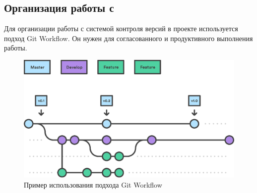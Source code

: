 \subsection{Организация работы с \textcite{git}}
Для организации работы с системой контроля версий в проекте используется подход Git Workflow. Он нужен для согласованного и продуктивного выполнения работы.

\begin{figure}[h!]
    \begin{center}
        \includegraphics[scale=0.6]{images/git-workflow.eps}
    \end{center}
    \caption{Пример использования подхода Git Workflow}
\end{figure}

\clearpage